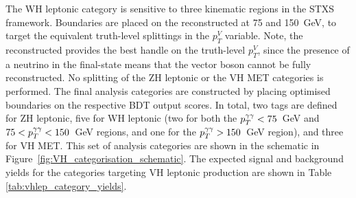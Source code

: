 The WH leptonic category is sensitive to three kinematic regions in the STXS framework. Boundaries are placed on the reconstructed \ptgg at 75 and 150~GeV, to target the equivalent truth-level splittings in the $p_T^V$ variable. Note, the reconstructed \ptgg provides the best handle on the truth-level $p_T^V$, since the presence of a neutrino in the final-state means that the vector boson cannot be fully reconstructed. No splitting of the ZH leptonic or the VH MET categories is performed. The final analysis categories are constructed by placing optimised boundaries on the respective BDT output scores. In total, two tags are defined for ZH leptonic, five for WH leptonic (two for both the $p_T^{\gamma\gamma}<75$~GeV and $75<p_T^{\gamma\gamma}<150$~GeV regions, and one for the $p_T^{\gamma\gamma}>150$~GeV region), and three for VH MET. This set of analysis categories are shown in the schematic in Figure~\ref{fig:VH_categorisation_schematic}. The expected signal and background yields for the categories targeting VH leptonic production are shown in Table \ref{tab:vhlep_category_yields}.


